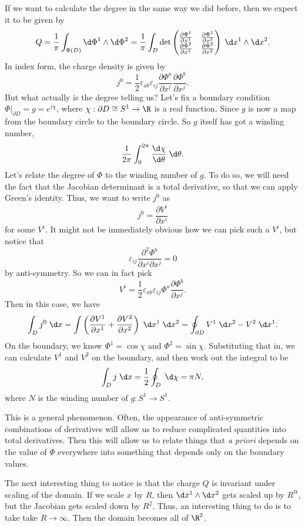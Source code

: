 \documentclass[a4paper]{article}
\begin{document}
If we want to calculate the degree in the same way we did before, then we expect it to be given by
\[
  Q = \frac{1}{\pi} \int_{\Phi(D)} \d \Phi^1 \wedge \d \Phi^2 = \frac{1}{\pi} \int_D \det
  \begin{pmatrix}
    \frac{\partial \Phi^1}{\partial x^1} & \frac{\partial \Phi^1}{\partial x^2}\\
    \frac{\partial \Phi^2}{\partial x^1} & \frac{\partial \Phi^2}{\partial x^2}
  \end{pmatrix}\;\d x^1 \wedge \d x^2.
\]
In index form, the charge density is given by
\[
  j^0 = \frac{1}{2} \varepsilon_{ab} \varepsilon_{ij} \frac{\partial \Phi^a}{\partial x^i} \frac{\partial \Phi^b}{\partial x^j}.
\]
But what actually is the degree telling us? Let's fix a boundary condition $\Phi|_{\partial D} = g = e^{i\chi}$, where $\chi: \partial D \cong S^1 \to \R$ is a real function. Since $g$ is now a map from the boundary circle to the boundary circle. So $g$ itself has got a winding number,
\[
  \frac{1}{2\pi} \int_0^{2\pi} \frac{\d \chi}{\d \theta} \;\d \theta.
\]
Let's relate the degree of $\Phi$ to the winding number of $g$. To do so, we will need the fact that the Jacobian determinant is a total derivative, so that we can apply Green's identity. Thus, we want to write $j^0$ as
\[
  j^0 = \frac{\partial V^i}{\partial x^i}
\]
for some $V^i$. It might not be immediately obvious how we can pick such a $V^i$, but notice that
\[
  \varepsilon_{ij} \frac{\partial^2 \Phi^b}{\partial x^i \partial x^j} = 0
\]
by anti-symmetry. So we can in fact pick
\[
  V^i = \frac{1}{2} \varepsilon_{ab}\varepsilon_{ij} \Phi^a \frac{\partial \Phi^b}{\partial x^j}.
\]
Then in this case, we have
\[
  \int_D j^0 \;\d x = \int \left(\frac{\partial V^1}{\partial x^1} + \frac{\partial V^2}{\partial x^2}\right)\;\d x^1 \;\d x^2 = \oint_{\partial D} V^1 \;\d x^2 - V^2 \;\d x^1.
\]
On the boundary, we know $\Phi^1 = \cos \chi$ and $\Phi^2 = \sin \chi$. Substituting that in, we can calculate $V^1$ and $V^2$ on the boundary, and then work out the integral to be
\[
  \int_D j\;\d x = \frac{1}{2} \oint_D \;\d \chi = \pi N,
\]
where $N$ is the winding number of $g: S^1 \to S^1$.

This is a general phenomenon. Often, the appearance of anti-symmetric combinations of derivatives will allow us to reduce complicated quantities into total derivatives. Then this will allow us to relate things that \emph{a priori} depends on the value of $\Phi$ everywhere into something that depends only on the boundary values.

The next interesting thing to notice is that the charge $Q$ is invariant under scaling of the domain. If we scale $x$ by $R$, then $\d x^1 \wedge \d x^2$ gets scaled up by $R^@$, but the Jacobian gets scaled down by $R^2$. Thus, an interesting thing to do is to take take $R \to \infty$. Then the domain becomes all of $\R^2$.
\end{document}
